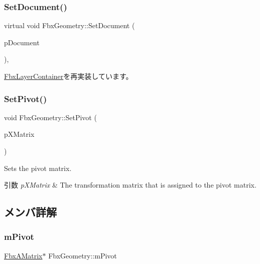 \subsubsection{\texorpdfstring{Set\+Document()}{SetDocument()}}
{\footnotesize\ttfamily virtual void Fbx\+Geometry\+::\+Set\+Document (\begin{DoxyParamCaption}\item[{\hyperlink{class_fbx_document}{Fbx\+Document} $\ast$}]{p\+Document }\end{DoxyParamCaption})\hspace{0.3cm}{\ttfamily [protected]}, {\ttfamily [virtual]}}



\hyperlink{class_fbx_layer_container_a1743b1727b9f522d69bbf0d65c2a5073}{Fbx\+Layer\+Container}を再実装しています。

\mbox{\label{class_fbx_geometry_a0b6b14186134a64ad55a47bcac865d70}} 
\subsubsection{\texorpdfstring{Set\+Pivot()}{SetPivot()}}
{\footnotesize\ttfamily void Fbx\+Geometry\+::\+Set\+Pivot (\begin{DoxyParamCaption}\item[{\hyperlink{class_fbx_a_matrix}{Fbx\+A\+Matrix} \&}]{p\+X\+Matrix }\end{DoxyParamCaption})}

Sets the pivot matrix. 
\begin{DoxyParams}{引数}
{\em p\+X\+Matrix} & The transformation matrix that is assigned to the pivot matrix. \\
\hline
\end{DoxyParams}


\subsection{メンバ詳解}
\mbox{\label{class_fbx_geometry_ab9f5852d38a38a9efb0ab63bd74503c0}} 
\subsubsection{\texorpdfstring{m\+Pivot}{mPivot}}
{\footnotesize\ttfamily \hyperlink{class_fbx_a_matrix}{Fbx\+A\+Matrix}$\ast$ Fbx\+Geometry\+::m\+Pivot\hspace{0.3cm}{\ttfamily [protected]}}


